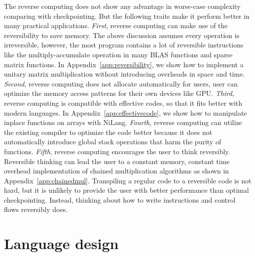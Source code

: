 \documentclass{article}
\newcommand{\<}{\langle}
\renewcommand{\>}{\rangle}
\newcommand{\App}[1]{Appendix~\ref{#1}}
\theoremstyle{definition}\newtheorem{definition}{\textit{Definition}}
\begin{document}
The reverse computing does not show any advantage in worse-case complexity comparing with checkpointing.
But the following traits make it perform better in many practical applications.
\textit{First}, reverse computing can make use of the reversibility to save memory. The above discussion assumes every operation is irreversible, however, the most program contains a lot of reversible instructions like the multiply-accumulate operation in many BLAS functions and sparse matrix functions. In \App{app:reversibility}, we show how to implement a unitary matrix multiplication without introducing overheads in space and time.
\textit{Second}, reverse computing does not allocate automatically for users, user can optimize the memory access patterns for their own devices like GPU.
\textit{Third}, reverse computing is compatible with effective codes, so that it fits better with modern languages. In \App{app:effectivecode}, we show how to manipulate inplace functions on arrays with NiLang.
\textit{Fourth}, reverse computing can utilize the existing compiler to optimize the code better because it does not automatically introduce global stack operations that harm the purity of functions.
\textit{Fifth}, reverse computing encourages the user to think reversibly. Reversible thinking can lead the user to a constant memory, constant time overhead implementation of chained multiplication algorithms as shown in \App{app:chainedmul}.
Transpiling a regular code to a reversible code is not hard, but it is unlikely to provide the user with better performance than optimal checkpointing. Instead, thinking about how to write instructions and control flows reversibly does.

\section{Language design}\label{sec:lang}
\end{document}

